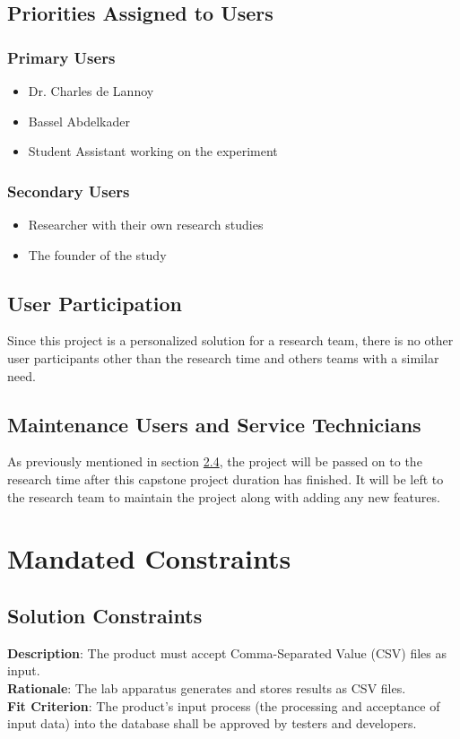 \documentclass[12pt]{article}
\begin{document}
\subsection{Priorities Assigned to Users}
\subsubsection{Primary Users}
\begin{itemize}
  \item Dr. Charles de Lannoy
  \item Bassel Abdelkader
  \item Student Assistant working on the experiment 
\end{itemize}

\subsubsection{Secondary Users}
\begin{itemize}
  \item Researcher with their own research studies 
  \item The founder of the study
\end{itemize}
\subsection{User Participation}
Since this project is a personalized solution for a research team, there is no
other user participants other than the research time and others teams with a
similar need. 
\subsection{Maintenance Users and Service Technicians}
As previously mentioned in section \hyperref[sec:2.4]{2.4}, the project will be passed on to the
research time after this capstone project duration has finished. It will be left
to the research team to maintain the project along with adding any new features.

\section{Mandated Constraints}
\subsection{Solution Constraints}
\textbf{Description}: The product must accept Comma-Separated Value (CSV) files
as input.\\
\textbf{Rationale}: The lab apparatus generates and stores results as CSV
files.\\
\textbf{Fit Criterion}: The product's input process (the processing and
acceptance of input data) into the database shall be approved by testers and
developers.
\end{document}
